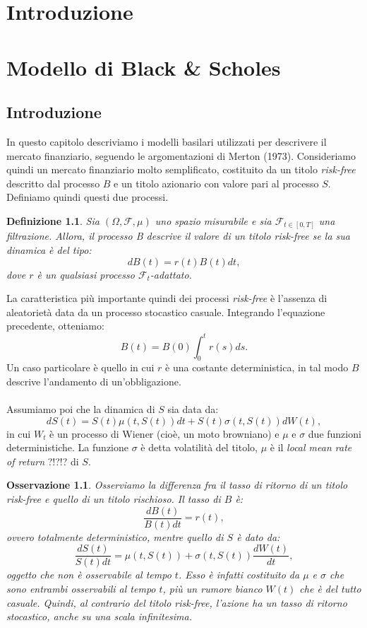\documentclass[a4paper,10pt]{report}
\newtheorem{definition}{Definizione}[chapter]
\theoremstyle{osservazione}
\newtheorem{osservazione}{Osservazione}[chapter]
\theoremstyle{esempio}
\theoremstyle{notazione}
\theoremstyle{corollario}
\begin{document}
	\clearpage
	\thispagestyle{empty}
	
	\clearpage


\tableofcontents

\setcounter{secnumdepth}{0}

\chapter*{Introduzione}

\chapter{Modello di Black \& Scholes}

\section{Introduzione}
In questo capitolo descriviamo i modelli basilari utilizzati per descrivere il mercato finanziario, seguendo le argomentazioni di Merton (1973). Consideriamo quindi un mercato finanziario molto semplificato, costituito da un titolo \emph{risk-free} descritto dal processo $B$ e un titolo azionario con valore pari al processo $S$. Definiamo quindi questi due processi.
\begin{definition}
Sia $(\Omega,\mathcal{F},\mu)$ uno spazio misurabile e sia $\mathcal{F}_{t\in [ 0,T ]}$ una filtrazione. Allora, il processo B descrive il valore di un titolo \emph{risk-free} se la sua dinamica \`e del tipo: $$dB(t)=r(t)B(t)dt,$$dove $r$ \`e un qualsiasi processo $\mathcal{F}_t$-adattato.
\end{definition}
La caratteristica pi\`u importante quindi dei processi \emph{risk-free} \`e l'assenza di aleatoriet\`a data da un processo stocastico casuale. Integrando l'equazione precedente, otteniamo: $$B(t)=B(0)\int_0^tr(s)ds.$$ Un caso particolare \`e quello in cui $r$ \`e una costante deterministica, in tal modo $B$ descrive l'andamento di un'obbligazione.\\\\Assumiamo poi che la dinamica di $S$ sia data da: $$dS(t)=S(t)\mu(t,S(t))dt+S(t)\sigma(t,S(t))dW(t),$$ in cui $W_t$ \`e un processo di Wiener (cio\`e, un moto browniano) e $\mu$ e $\sigma$ due funzioni deterministiche. La funzione $\sigma$ \`e detta volatilit\`a del titolo, $\mu$ \`e il \emph{local mean rate of return} ?!?!? di $S$.
\begin{osservazione}
Osserviamo la differenza fra il tasso di ritorno di un titolo \emph{risk-free} e quello di un titolo rischioso. Il tasso di $B$ \`e: $$\frac{dB(t)}{B(t)dt}=r(t),$$ ovvero totalmente deterministico, mentre quello di $S$ \`e dato da: $$\frac{dS(t)}{S(t)dt}=\mu(t,S(t))+\sigma(t,S(t)) \frac{dW(t)}{dt},$$ oggetto che non \`e osservabile al tempo $t$. Esso \`e infatti costituito da $\mu$ e $\sigma$ che sono entrambi osservabili al tempo $t$, pi\`u un rumore bianco $W(t)$ che \`e del tutto casuale. Quindi, al contrario del titolo \emph{risk-free}, l'azione ha un tasso di ritorno stocastico, anche su una scala infinitesima.
\end{osservazione}
\end{document}
